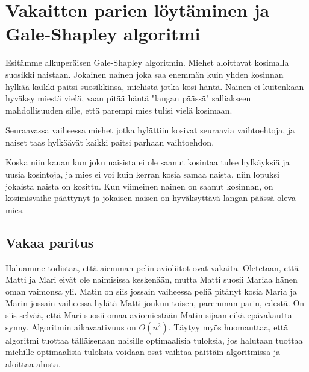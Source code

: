 \documentclass[finnish]{tktltiki2}
\theoremstyle{definition}
\theoremstyle{remark}
\begin{document}
\section{Vakaitten parien löytäminen ja Gale-Shapley algoritmi}
Esitämme alkuperäisen Gale-Shapley algoritmin.
Miehet aloittavat kosimalla suosikki naistaan. Jokainen nainen joka saa enemmän kuin yhden kosinnan hylkää kaikki paitsi suosikkinsa, miehistä jotka kosi häntä. Nainen ei kuitenkaan hyväksy miestä vielä, vaan pitää häntä "langan päässä" salliakseen mahdollisuuden sille, että parempi mies tulisi vielä kosimaan.

Seuraavassa vaiheessa miehet jotka hylättiin kosivat seuraavia vaihtoehtoja, ja naiset taas hylkäävät kaikki paitsi parhaan vaihtoehdon.

Koska niin kauan kun joku naisista ei ole saanut kosintaa tulee hylkäyksiä ja uusia kosintoja, ja mies ei voi kuin kerran kosia samaa naista, niin lopuksi jokaista naista on kosittu. Kun viimeinen nainen on saanut kosinnan, on kosimisvaihe päättynyt ja jokaisen naisen on hyväksyttävä langan päässä oleva mies. \cite[p. 12-13]{gale62a}

\subsection{Vakaa paritus}
Haluamme todistaa, että aiemman pelin avioliitot ovat vakaita.
Oletetaan, että Matti ja Mari eivät ole naimisissa keskenään, mutta Matti suosii Mariaa hänen oman vaimonsa yli. Matin on siis jossain vaiheessa peliä pitänyt kosia Maria ja Marin jossain vaiheessa hylätä Matti jonkun toisen, paremman parin, edestä. On siis selvää, että Mari suosii omaa aviomiestään Matin sijaan eikä epävakautta synny. \cite[p. 13]{gale62a} Algoritmin aikavaativuus on $O(n^2)$. Täytyy myös huomauttaa, että algoritmi tuottaa tälläisenaan naisille optimaalisia tuloksia, jos halutaan tuottaa miehille optimaalisia tuloksia voidaan osat vaihtaa päittäin algoritmissa ja aloittaa alusta.

%
%
 
%

%


\lastpage
\end{document}
